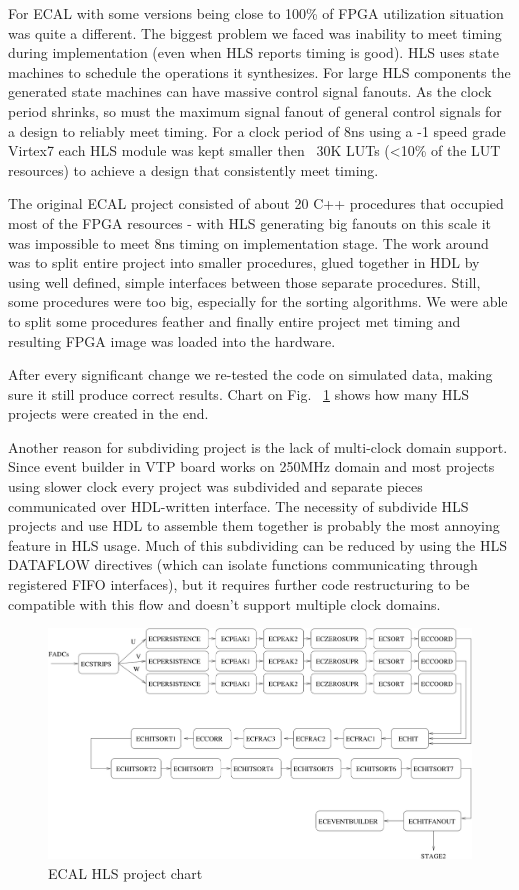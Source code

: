For ECAL with some versions being close to 100\% of FPGA utilization situation was quite a different.
The biggest problem we faced was inability to meet timing during implementation (even when HLS reports timing is good). HLS uses state machines to schedule the operations it synthesizes. For large HLS components the generated state machines can have massive control signal fanouts. As the clock period shrinks, so must the maximum signal fanout of general control signals for a design to reliably meet timing. For a clock period of 8ns using a -1 speed grade Virtex7 each HLS module was kept smaller then ~30K LUTs (<10\% of the LUT resources) to achieve a design that consistently meet timing.

The original ECAL project consisted of about 20 C++ procedures that occupied most of the FPGA resources - with HLS generating big fanouts on this scale it was impossible to meet 8ns timing on implementation stage. The work around was to split entire project into smaller procedures, glued together in HDL by using well defined, simple interfaces between those separate procedures. Still, some procedures were too big, especially for the sorting algorithms. We were able to split some procedures feather and finally entire project met timing and resulting FPGA image was loaded into the hardware.

After every significant change we re-tested the code on simulated data, making sure it still produce correct results. Chart on Fig. ~\ref{fig:hls_chart} shows how many HLS projects were created in the end.

Another reason for subdividing project is the lack of multi-clock domain support. Since event builder in VTP board works on 250MHz domain and most projects using slower clock every project was subdivided and separate pieces communicated over HDL-written interface. The necessity of subdivide HLS projects and use HDL to assemble them together is probably the most annoying feature in HLS usage. Much of this subdividing can be reduced by using the HLS DATAFLOW directives (which can isolate functions communicating through registered FIFO interfaces), but it requires further code restructuring to be compatible with this flow and doesn't support multiple clock domains.

\begin{figure}[hbt]
	\centering
	\includegraphics[width=1.0\columnwidth,keepaspectratio]{img/hls_chart.png}
	\caption{ECAL HLS project chart}
	\label{fig:hls_chart}
\end{figure}


